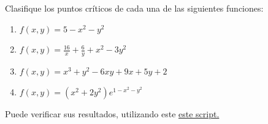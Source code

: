 \begin{resuelto}
	Clasifique los puntos cr\'iticos de cada una de las siguientes funciones:
	\begin{enumerate}
		\item $f(x,y)=5-x^2-y^2$
		\item $f(x,y)=\frac{16}{x}+\frac{6}{y}+x^2-3y^2$
		\item $f(x,y)=x^3+y^2-6xy+9x+5y+2$
		\item $f(x,y)=(x^2+2y^{2})e^{1-x^2-y^2}$
	\end{enumerate}

\end{resuelto}

Puede verificar sus resultados, utilizando este \href{http://sagecell.sagemath.org/?z=eJyVVMGK2zAQvRv8D4NyWBu8ISz00l33slnIpaW0x9JdxrJMBYoUJDvYn9MP2FM_IT_WkWIr3iQLbUISWXrz3szoTRa14Aotbo0DhQ72aCVWSrg06YuhpMfshhY3-X2apMmiFo3U0oN1J1xrEZpOc3n4o8NhJYDjtpJoiQyO4HBKa78zgf0j8k7Y2gAq2FlDkltMkybrCxhyKOHDbf98dzs833ndnRVtO7zsrNRtxjwoYFgBx3VO6hwV71QsZIeWSwyFNH0AldAsa9lQRH7B2M8p-4mzGabtMXK4jBzmkUPM5rtRHZdGj_mA4B1OpVPBnW4NcHt4bSU3npPIgD0FkNHCXUGxM-kxzQIYia_YeWZjLrNjJV1bOqP2IvsxtaRcxaxp_bOA0P6Y0FSFcKTeGDumJDV4so9pAvR6IxsAvgGPp-ugUn4J5yRqAwO4DmrpuJVbqVG3Ik02ZbMcAdlJezOGnNcdDmDugc3U9fWxkOPzshbtjG4914R3ydcz3nX0QT-2KxrofSO9dVK00kLsUXVHN9AntMnFu3X3x7kR4ZCQxpIH-hLpNsrKe5kcFAgsAWuEjlpJM0QjaMjgWK7SpPJfsdxHmgHZSB5NdyHJLgfr6dxzcJKlfLBkBRYMKvqtLkpfZ0i7U-f8-tqYnTC-OSMqTWQzxjysrrmKZUGZ3lXBcgpmlM7XkCpV5qRS6B0uVOT5NPHQzqQU9_6N__Ph1f_VwTehsJV74xV8ZFCZOB_-l_N3f84plBNXi_5iwPl7E1QjmVlY717L8r-wl8z7&lang=sage}{este script.}


%
%
%
%
%
%
%
%
%
%
%

